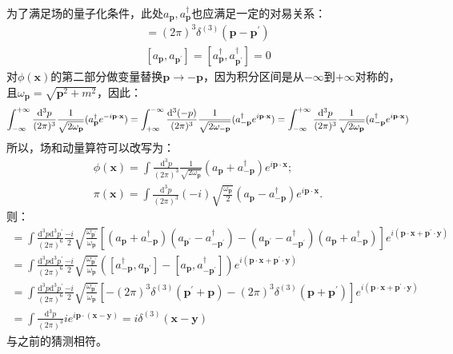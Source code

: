 \documentclass{book}
\begin{document}
为了满足场的量子化条件，此处$a_{\mathbf{p}},a_{\mathbf{p}}^\dagger$也应满足一定的对易关系：
\begin{gather*}
[a_{\mathbf{p}},a_{\mathbf{p}^{\prime}}^{\dagger}]=(2\pi)^3\delta^{(3)}(\mathbf{p}-\mathbf{p}^{\prime}) \\
[a_{\mathbf{p}},a_{\mathbf{p^\prime}}]=[a_{\mathbf{p}}^\dagger,a_{\mathbf{p^\prime}}^\dagger]=0    
\end{gather*}
对$\phi(\mathbf{x})$的第二部分做变量替换$\mathbf{p}\to-\mathbf{p}$，因为积分区间是从$-\infty$到$+\infty$对称的，且$\omega_{\mathbf{p}}=\sqrt{\mathbf{p}^2+m^2}$，因此：
$$
\int_{-\infty}^{+\infty}\frac{\mathrm{d}^3p}{(2\pi)^3}\frac{1}{\sqrt{2\omega_{\mathbf{p}}}}(a_{\mathbf{p}}^\dagger {e}^{-{i}\mathbf{p}\cdot\mathbf{x}})=\int_{+\infty}^{-\infty}\frac{\mathrm{d}^3(-p)}{(2\pi)^3}\frac{1}{\sqrt{2\omega_{\mathbf{-p}}}}(a_{-\mathbf{p}}^\dagger {e}^{{i}\mathbf{p}\cdot\mathbf{x}})\\
=\int_{-\infty}^{+\infty}\frac{\mathrm{d}^3p}{(2\pi)^3}\frac{1}{\sqrt{2\omega_{\mathbf{p}}}}(a_{-\mathbf{p}}^\dagger {e}^{{i}\mathbf{p}\cdot\mathbf{x}})
$$
所以，场和动量算符可以改写为：
$$
\begin{gathered}
\phi(\mathbf{x}) =\int\frac{\mathrm{d}^{3}p}{(2\pi)^{3}}\frac1{\sqrt{2\omega_{\mathbf{p}}}}(a_{\mathbf{p}}+a_{-\mathbf{p}}^{\dagger}){e}^{{i}\mathbf{p}\cdot\mathbf{x}}; \\
\pi(\mathbf{x}) =\int\frac{\mathrm{d}^{3}p}{(2\pi)^{3}}\left(-{i}\right)\sqrt{\frac{\omega_{\mathbf{p}}}2}(a_{\mathbf{p}}-a_{-\mathbf{p}}^{\dagger}){e}^{{i}\mathbf{p}\cdot\mathbf{x}}. 
\end{gathered}
$$
则：
\begin{gather*}
    [\phi(\mathbf{x}),\pi(\mathbf{y})]=\int\frac{\mathrm{d}^3p \mathrm{d}^3p^\prime}{(2\pi)^6}\frac{-{i}}{2}\sqrt{\frac{\omega_{\mathbf{p^\prime}}}{\omega_{\mathbf{p}}}}\left[(a_{\mathbf{p}}+a_{-\mathbf{p}}^\dagger)(a_{\mathbf{p}^\prime}-a_{-\mathbf{p}^\prime}^\dagger)-(a_{\mathbf{p}^\prime}-a_{-\mathbf{p}^\prime}^\dagger)(a_{\mathbf{p}}+a_{-\mathbf{p}}^\dagger)\right]{e}^{{i}(\mathbf{p}\cdot\mathbf{x}+\mathbf{p}^\prime\cdot\mathbf{y})} \\
=\int\frac{\mathrm{d}^3p \mathrm{d}^3p^\prime}{(2\pi)^6}\frac{-{i}}{2}\sqrt{\frac{\omega_{\mathbf{p^\prime}}}{\omega_{\mathbf{p}}}}\left([a_{-\mathbf{p}}^\dagger,a_{\mathbf{p}^\prime}]-[a_{\mathbf{p}},a_{-\mathbf{p}^\prime}^\dagger]
\right){e}^{{i}(\mathbf{p}\cdot\mathbf{x}+\mathbf{p}^\prime\cdot\mathbf{y})} \\=\int\frac{\mathrm{d}^3p \mathrm{d}^3p^\prime}{(2\pi)^6}\frac{-{i}}{2}\sqrt{\frac{\omega_{\mathbf{p^\prime}}}{\omega_{\mathbf{p}}}}\left[-(2\pi)^3\delta^{(3)}(\mathbf{p}^\prime+\mathbf{p})-(2\pi)^3\delta^{(3)}(\mathbf{p}+\mathbf{p}^\prime)
\right]{e}^{{i}(\mathbf{p}\cdot\mathbf{x}+\mathbf{p}^\prime\cdot\mathbf{y})}\\
=\int\frac{\mathrm{d}^3p}{(2\pi)^3}{i}{e}^{{i}\mathbf{p}\cdot(\mathbf{x}-\mathbf{y})}={i}\delta^{(3)}(\mathbf{x}-\mathbf{y})
\end{gather*}
与之前的猜测相符。
\end{document}
